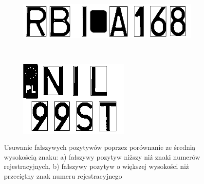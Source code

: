 \begin{figure}
  \centering
  \begin{subfigure}[b]{0.65\textwidth}
    \includegraphics[width=\textwidth]{img/standard-deviation-condition-too-small}
    \label{fig:standard_deviation_too_small}
    \caption{}
  \end{subfigure}
  ~
  \begin{subfigure}[b]{0.40\textwidth}
    \includegraphics[width=\textwidth]{img/standard-deviation-condition-too-big}
    \label{fig:standard_deviation_too_big}
    \caption{}
  \end{subfigure}
  \caption{Usuwanie fałszywych pozytywów poprzez porównanie ze średnią wysokością znaku: a) fałszywy pozytyw niższy niż znaki numerów rejestracyjnych, b) fałszywy pozytyw o większej wysokości niż przeciętny znak numeru rejestracyjnego}
  \label{fig:standard_deviation_condition}
\end{figure}

